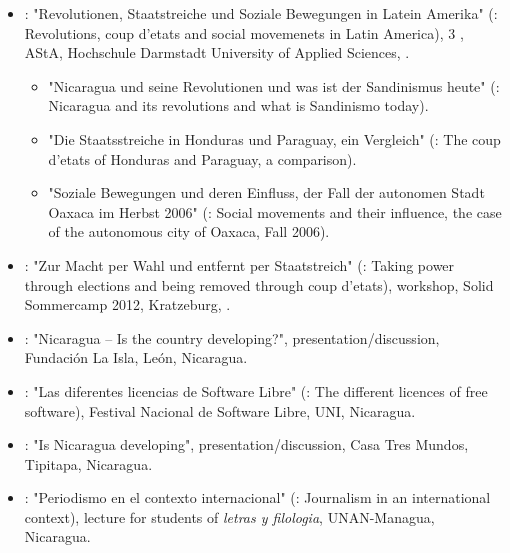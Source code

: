\begin{itemize}
\item {}: "Revolutionen, Staatstreiche und Soziale Bewegungen in Latein Amerika" (\english: Revolutions, coup d'etats and social movemenets in Latin America), 3 \days \series, AStA, Hochschule Darmstadt University of Applied Sciences, \Germany.
	\begin{itemize}
	\item "Nicaragua und seine Revolutionen und was ist der Sandinismus heute" (\english: Nicaragua and its revolutions and what is Sandinismo today).
	\item "Die Staatsstreiche in Honduras und Paraguay, ein Vergleich" (\english: The coup d'etats of Honduras and Paraguay, a comparison).
	\item "Soziale Bewegungen und deren Einfluss, der Fall der autonomen Stadt Oaxaca im Herbst 2006" (\english: Social movements and their influence, the case of the autonomous city of Oaxaca, Fall 2006).
	\end{itemize}


\item {}: "Zur Macht per Wahl und entfernt per Staatstreich" (\english: Taking power through elections and being removed through coup d'etats), workshop, Solid Sommercamp 2012, Kratzeburg, \Germany.

\item {}: "Nicaragua – Is the country developing?", presentation/discussion, Fundación La Isla, León, Nicaragua.

\item {}: "Las diferentes licencias de Software Libre" (\english: The different licences of free software), Festival Nacional de Software Libre, UNI, Nicaragua.

\item {}: "Is Nicaragua developing", presentation/discussion, Casa Tres Mundos, Tipitapa, Nicaragua.

\item {}: "Periodismo en el contexto internacional" (\english: Journalism in an international context), lecture for students of \emph{letras y filologia}, UNAN-Managua, Nicaragua.


\end{itemize}
